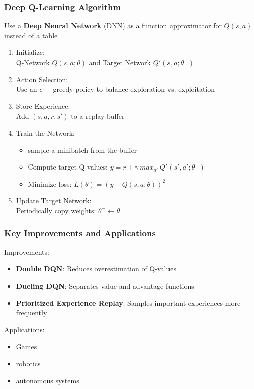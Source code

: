 \begin{frame}
	\frametitle{Deep Q-Learning Algorithm }
	\vspace{0.2cm}
	Use a \textbf{Deep Neural Network} (DNN) as a function approximator for $Q(s,a)$ instead of a table
		\begin{enumerate}		
			\pause
			\item Initialize: \\ Q-Network $Q(s,a;\theta)$ and Target Network $Q'(s,a;\theta^{-})$
			\pause
			\item Action Selection: \\ Use an $\epsilon-$ greedy policy to balance exploration vs. exploitation
			\pause
			\item Store Experience: \\ Add $(s,a,r,s')$ to a replay buffer
			\pause
			\item Train the Network: \\ 
				\begin{itemize} 
					 \item sample a minibatch from the buffer
					 \item Compute target Q-values: $y = r + \gamma \ max_{a'} \ Q'(s',a';\theta^{-})$
					\item Minimize loss: $L(\theta)=(y-Q(s,a;\theta))^2$
				\end{itemize}
			\pause
			\item Update Target Network: \\ Periodically copy weights: $\theta^{-} \leftarrow \theta$

		\end{enumerate}
\end{frame}

\begin{frame}
	\frametitle{Key Improvements and Applications}
	\vspace{0.5cm}
	Improvements:
		\begin{itemize}		
			\item \textbf{Double DQN}: Reduces overestimation of Q-values
			\item\textbf{Dueling DQN}: Separates value and advantage functions
			\item \textbf{Prioritized Experience Replay}: Samples important experiences more frequently
		\end{itemize}
	\pause
	Applications:
		\begin{itemize}
			\item Games
			\item robotics
			\item autonomous systems
		\end{itemize}
\end{frame}


